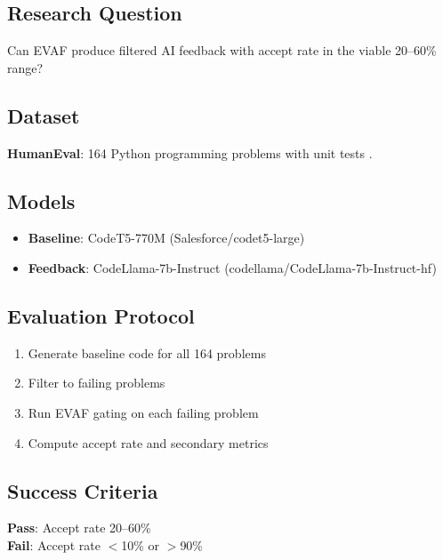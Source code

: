 
\subsection{Research Question}

Can EVAF produce filtered AI feedback with accept rate in the viable 20--60\% range?

\subsection{Dataset}

\textbf{HumanEval}: 164 Python programming problems with unit tests \citep{chen2021humaneval}.

\subsection{Models}

\begin{itemize}
    \item \textbf{Baseline}: CodeT5-770M (Salesforce/codet5-large) \citep{wang2021codet5}
    \item \textbf{Feedback}: CodeLlama-7b-Instruct (codellama/CodeLlama-7b-Instruct-hf) \citep{roziere2023codellama}
\end{itemize}

\subsection{Evaluation Protocol}

\begin{enumerate}
    \item Generate baseline code for all 164 problems
    \item Filter to failing problems
    \item Run EVAF gating on each failing problem
    \item Compute accept rate and secondary metrics
\end{enumerate}

\subsection{Success Criteria}

\textbf{Pass}: Accept rate 20--60\%\\
\textbf{Fail}: Accept rate $<$10\% or $>$90\%
